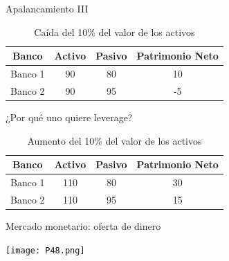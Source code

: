 \documentclass{beamer}
\begin{document}
\begin{frame}{Apalancamiento III}
   \begin{table}[H]
    \centering

    \begin{tabular}{|c|c|c|c|}
    \hline
\textbf{Banco}    & \textbf{Activo} & \textbf{Pasivo} & \textbf{Patrimonio Neto}\\
         \hline \hline
         Banco 1 &  90 &  80 & 10\\[1mm]
        \hline
       Banco 2 & 90  &  95& -5\\[1mm]
        \hline
    \end{tabular}
    \caption{Caída del 10\% del valor de los activos}
    \label{caida10pp}
\end{table} 
\end{frame} 

\begin{frame}{¿Por qué uno quiere leverage?}
    

\begin{table}[H]
    \centering

    \begin{tabular}{|c|c|c|c|}
    \hline
\textbf{Banco}    & \textbf{Activo} & \textbf{Pasivo} & \textbf{Patrimonio Neto}\\
         \hline \hline
         Banco 1 &  110 &  80 & 30\\[1mm]
        \hline
       Banco 2 & 110  &  95& 15\\[1mm]
        \hline
    \end{tabular}
    \caption{Aumento del 10\% del valor de los activos}
    \label{caida10pp}
\end{table}

\end{frame}












\begin{frame}{Mercado monetario: oferta de dinero}

\centering\texttt{[image: P48.png]}\

  

\end{frame}
\end{document}

